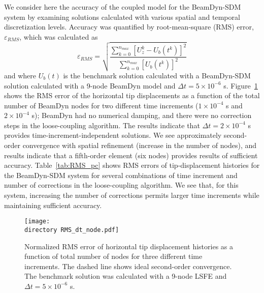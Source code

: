 \documentclass{aiaa-tc}
\def\directory{EPSF/}
\begin{document}
We consider here the accuracy of the coupled model for the BeamDyn-SDM system by examining solutions calculated with various spatial and temporal discretization levels.
Accuracy was quantified by root-mean-square (RMS) error, $\varepsilon_{RMS}$,  which was calculated as
\begin{equation}
\varepsilon_{RMS}=\sqrt{\frac{\sum_{k=0}^{n_{max}}[U_z^k-U_b(t^k)]^2}{\sum_{k=0}^{n_{max}}[U_b(t^k)]^2}}
\label{RMSdefi}
\end{equation} 
and where $U_b(t)$ is the benchmark solution calculated with a BeamDyn-SDM solution calculated with a 9-node BeamDyn model and $\Delta t = 5 \times 10^{-6}$ s. Figure~\ref{fig:ConvDTNode} shows the RMS error of the horizontal tip displacements as a function of the total number of BeamDyn nodes for two different time increments ($1 \times 10^{-4}$ s and $2 \times 10^{-4}$ s); BeamDyn had no numerical damping, and there were no correction steps in the loose-coupling algorithm.  The results indicate that $\Delta t = 2 \times 10^{-4}$ s provides time-increment-independent solutions.
We see approximately second-order convergence with spatial refinement (increase in the number of nodes), and results indicate that a fifth-order element (six nodes) provides results of sufficient accuracy.
Table~\ref{tab:RMS_pc} shows RMS errors of tip-displacement histories for the BeamDyn-SDM system for several combinations of time increment and number of corrections in the loose-coupling algorithm. We see that, for this system, increasing the number of corrections permits larger time increments while maintaining sufficient accuracy.  

\begin{figure}[h!tp]
\centering
\texttt{[image: \\directory RMS\_dt\_node.pdf]}
\caption{Normalized RMS error of horizontal tip displacement histories as a function of total number of nodes for three different time increments. The dashed line shows ideal second-order convergence. The benchmark solution was calculated with a 9-node LSFE and $\Delta t = 5 \times 10^{-6}$ s.} 
\label{fig:ConvDTNode}
\end{figure}
\end{document}
